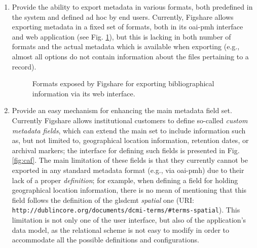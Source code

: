 \begin{enumerate}
    \item Provide the ability to export metadata in various formats, both predefined in the system and defined ad hoc by end users. Currently, Figshare allows exporting metadata in a fixed set of formats, both in its \gls{oai}-\gls{pmh} interface and web application (see Fig. \ref{fig:figexport}), but this is lacking in both number of formats and the actual metadata which is available when exporting (e.g., almost all options do not contain information about the files pertaining to a record).

    \begin{figure}[thpb]
        \centering
        \caption{Formats exposed by Figshare for exporting bibliographical information via its web interface.}
        \label{fig:figexport}
    \end{figure}

    \item Provide an easy mechanism for enhancing the main metadata field set. Currently Figshare allows institutional customers to define so-called \emph{custom metadata fields}, which can extend the main set to include information such as, but not limited to, geographical location information, retention dates, or archival markers; the interface for defining such fields is presented in Fig. \ref{fig:caf}. The main limitation of these fields is that they currently cannot be exported in any standard metadata format (e.g., via \gls{oai}-\gls{pmh}) due to their lack of a proper \emph{definition}; for example, when defining a field for holding geographical location information, there is no mean of mentioning that this field follows the definition of the gls{dcmt} \emph{spatial} one (URI: \nolinkurl{http://dublincore.org/documents/dcmi-terms/#terms-spatial}). This limitation is not only one of the user interface, but also of the application's data model, as the relational scheme is not easy to modify in order to accommodate all the possible definitions and configurations.


\end{enumerate}
